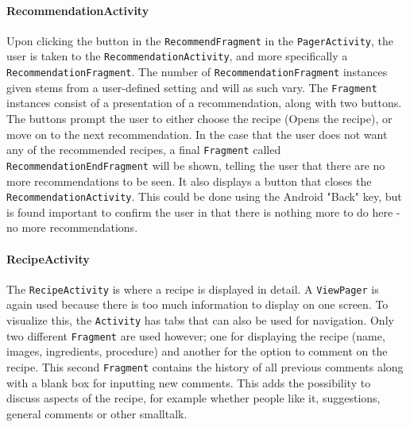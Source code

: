 \paragraph{RecommendationActivity}
Upon clicking the button in the \texttt{RecommendFragment} in the \texttt{PagerActivity}, the user is taken to the \texttt{RecommendationActivity}, and more specifically a \texttt{RecommendationFragment}. The number of \texttt{RecommendationFragment} instances given stems from a user-defined setting and will as such vary. The \texttt{Fragment} instances consist of a presentation of a recommendation, along with two buttons. The buttons prompt the user to either choose the recipe (Opens the recipe), or move on to the next recommendation. In the case that the user does not want any of the recommended recipes, a final \texttt{Fragment} called \texttt{RecommendationEndFragment} will be shown, telling the user that there are no more recommendations to be seen. It also displays a button that closes the \texttt{RecommendationActivity}. This could be done using the Android "Back" key, but is found important to confirm the user in that there is nothing more to do here - no more recommendations.

\paragraph{RecipeActivity}
The \texttt{RecipeActivity} is where a recipe is displayed in detail. A \texttt{ViewPager} is again used because there is too much information to display on one screen. To visualize this, the \texttt{Activity} has tabs that can also be used for navigation. Only two different \texttt{Fragment} are used however; one for displaying the recipe (name, images, ingredients, procedure) and another for the option to comment on the recipe. This second \texttt{Fragment} contains the history of all previous comments along with a blank box for inputting new comments. This adds the possibility to discuss aspects of the recipe, for example whether people like it, suggestions, general comments or other smalltalk.